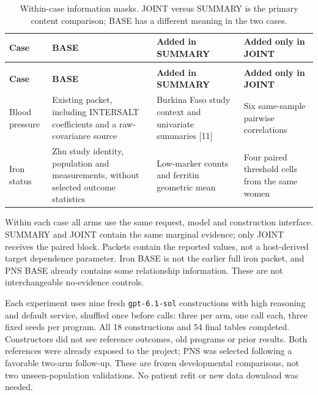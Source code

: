 \documentclass[11pt,letterpaper]{article}
\begin{document}
\begin{xltabular}{\linewidth}{@{}>{\raggedright\arraybackslash}X>{\raggedright\arraybackslash}X>{\raggedright\arraybackslash}X>{\raggedright\arraybackslash}X@{}}

\caption{Within-case information masks. JOINT versus SUMMARY is the primary content comparison; BASE has a different meaning in the two cases.}\label{tab:2} \\

\toprule

\textbf{Case} & \textbf{BASE} & \textbf{Added in SUMMARY} & \textbf{Added only in JOINT} \\

\midrule

\endfirsthead

\\

\toprule

\textbf{Case} & \textbf{BASE} & \textbf{Added in SUMMARY} & \textbf{Added only in JOINT} \\

\midrule

\endhead

\bottomrule

\endfoot

Blood pressure & Existing packet, including INTERSALT coefficients and a raw-covariance source & Burkina Faso study context and univariate summaries [11] & Six same-sample pairwise correlations \\

Iron status & Zhu study identity, population and measurements, without selected outcome statistics & Low-marker counts and ferritin geometric mean & Four paired threshold cells from the same women \\

\end{xltabular}

\endgroup

Within each case all arms use the same request, model and construction interface. SUMMARY and JOINT contain the same marginal evidence; only JOINT receives the paired block. Packets contain the reported values, not a host-derived target dependence parameter. Iron BASE is not the earlier full iron packet, and PNS BASE already contains some relationship information. These are not interchangeable no-evidence controls.


Each experiment uses nine fresh \texttt{gpt-\allowbreak{}6.1-\allowbreak{}sol} constructions with high reasoning and default service, shuffled once before calls: three per arm, one call each, three fixed seeds per program. All 18 constructions and 54 final tables completed. Constructors did not see reference outcomes, old programs or prior results. Both references were already exposed to the project; PNS was selected following a favorable two-arm follow-up. These are frozen developmental comparisons, not two unseen-population validations. No patient refit or new data download was needed.
\end{document}
